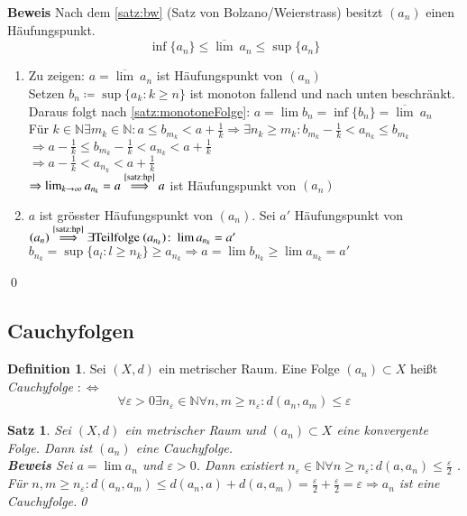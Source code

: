 \documentclass[ngerman,titlepage,twoside, parskip=half*]{scrreprt}
\newcommand*{\N}{\mathbb{N}}
\newcommand*{\perdef}{:\Leftrightarrow}
\theoremstyle{plain}
\newtheorem{theorem}{Satz}[section]
\theoremstyle{definition}
\newtheorem{definition}{Definition}
\theoremstyle{remark}
\begin{document}
\textbf{Beweis} Nach dem \autoref{satz:bw} (Satz von Bolzano/Weierstrass) besitzt $(a_n)$ einen Häufungspunkt.
\[\inf \{a_n\}\leq \overline{\lim}\ a_n \leq \sup \{a_n\}\]
\begin{enumerate}[1. Schr{i}tt]
  \item Zu zeigen: $a=\overline{\lim}\ a_n$ ist Häufungspunkt von $(a_n)$\\
    Setzen $b_n\coloneqq\sup \{a_k\colon k\geq n\}$ ist monoton fallend und nach unten beschränkt. Daraus folgt nach
    \autoref{satz:monotoneFolge}: $a=\lim b_n=\inf \{b_n\}=\overline{\lim}\ a_n$\\
    Für $k \in \N \exists m_k \in \N \colon a\leq b_{m_k}<a+\frac{1}{k}\Rightarrow \exists n_k\geq m_k\colon b_{m_k}-\frac{1}{k}
    <a_{n_k}\leq b_{m_k}$\\
    $\Rightarrow a-\frac{1}{k}\leq b_{m_k}-\frac{1}{k}<a_{n_k}<a+\frac{1}{k}$\\
    $\Rightarrow a-\frac{1}{k}<a_{n_k}<a+\frac{1}{k}$\\
    $\Rightarrow \lim_{k\rightarrow \infty} a_{n_k}=a\stackrel{\text{\autoref{satz:hp}}}{\Longrightarrow} a$ ist Häufungspunkt 
    von $(a_n)$
  \item $a$ ist grösster Häufungspunkt von $(a_n)$. Sei $a'$ Häufungspunkt von $(a_n)\stackrel{\text{\autoref{satz:hp}}}
    {\Longrightarrow} \exists \text{Teilfolge } (a_{n_k})\colon\lim a_{n_k}=a'$\\
    $b_{n_k}=\sup \{a_l\colon l\geq n_k\} \geq a_{n_k}\Rightarrow a=\lim b_{n_k}\geq \lim a_{n_k}=a'$
\end{enumerate}
\qed

\subsection{Cauchyfolgen}
\begin{definition}
Sei $(X,d)$ ein metrischer Raum. Eine Folge $(a_n) \subset X$ heißt \emph{Cauchy\-fol\-ge} $\perdef$
\[\forall \varepsilon > 0 \exists n_{\varepsilon}\in \N \forall n,m \geq
  n_{\varepsilon}\colon d(a_n,a_m)\leq \varepsilon\]
\end{definition}

\begin{theorem}
\label{satz:cf}
Sei $(X,d)$ ein metrischer Raum und $(a_n)\subset X$ eine konvergente Folge.
  Dann ist $(a_n)$ eine Cauchyfolge.\\
\textbf{Beweis} Sei $a=\lim a_n$ und $\varepsilon>0$. Dann existiert
  $n_{\varepsilon}\in \N \forall n\geq n_{\varepsilon}
\colon d(a,a_n)\leq \frac{\varepsilon}{2}$ . Für $n,m\geq n_{\varepsilon}\colon d(a_n,a_m)\leq d(a_n,a)+d(a,a_m)=\frac{\varepsilon}{2}
+\frac{\varepsilon}{2}=\varepsilon \Rightarrow a_n$ ist eine Cauchyfolge.\qed
\end{theorem}
\end{document}
